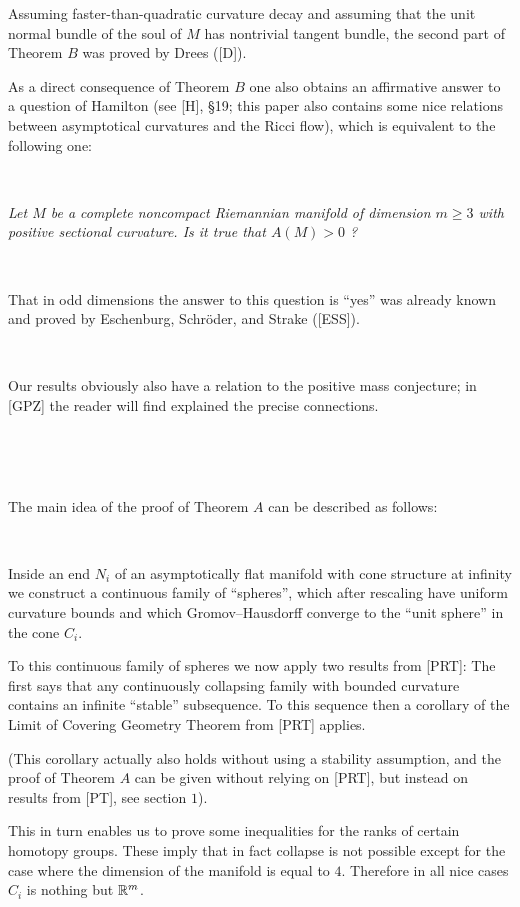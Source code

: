 Assuming faster-than-quadratic curvature decay and 
assuming 
that the unit normal bundle of the soul of $M$ 
has nontrivial tangent bundle,
the second part of Theorem $B$ was proved by Drees ([D]).


As a direct consequence of Theorem $B$ one also 
obtains an affirmative answer
to a question of Hamilton
(see [H], \S 19; this paper also contains some nice relations
between asymptotical curvatures and the Ricci flow), 
which is equivalent to
the following one:


\

\noindent
{\sl 
Let $M$ be a complete noncompact Riemannian manifold
of dimension $m\ge 3$ with positive sectional curvature.
Is it true that $A(M)>0$ ?
}

\

That in odd dimensions the answer to this question is ``yes''
was already known and proved by Eschenburg, Schr\"oder, and Strake ([ESS]).

\ 
 




Our results obviously 
also have a relation to the positive mass conjecture;
in [GPZ] the reader will find explained the precise connections.

\ 

\

The main idea of the proof of Theorem $A$ can be described as follows:

\

Inside an end $N_i$ of an asymptotically flat manifold with cone
structure at infinity we construct a continuous family of ``spheres'',
which after rescaling have uniform curvature bounds and which
Gromov--Hausdorff converge
to the ``unit sphere'' in the cone $C_i$. 

To this continuous family of spheres we now apply two results from [PRT]:
The first says that any continuously collapsing family with bounded curvature 
contains an infinite ``stable''
subsequence. 
To this sequence then
a corollary of the Limit of Covering Geometry Theorem from [PRT] applies.

(This corollary actually also holds without using a stability assumption,
and the proof of Theorem $A$ can be given without
relying on [PRT], but instead on results from [PT],
see section $1$).

This in turn enables us 
to prove some inequalities for the ranks of certain homotopy
groups. These imply that in fact collapse is not possible except for 
the case where the dimension of the manifold is equal to $4$.
Therefore in all nice cases $C_i$ is nothing but ${\Bbb R}^m$.

